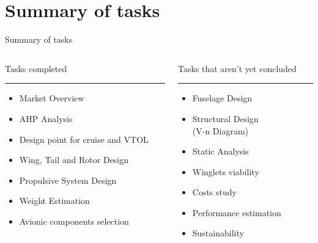 \section{Summary of tasks}
\begin{frame}{Summary of tasks}
    \begin{columns}[T] %
        \begin{column}{.48\textwidth}
        Tasks completed 
        \color{black}\rule{\linewidth}{1pt}
        \begin{itemize}
            \item[\Checkmark] Market Overview
            \item[\Checkmark] AHP Analysis
            \item[\Checkmark] Design point for cruise and VTOL 
            \item[\Checkmark] Wing, Tail and Rotor Design
            \item[\Checkmark] Propulsive System Design
            \item[\Checkmark] Weight Estimation
            \item[\Checkmark] Avionic components selection
        \end{itemize}
        \end{column}%
        \hfill%
        \begin{column}{.48\textwidth}
        Tasks that aren't yet concluded
        \color{black}\rule{\linewidth}{1pt}
        \begin{itemize}
           \item[\XSolidBrush] Fuselage Design
           \item[\XSolidBrush] Structural Design\\ (V-n Diagram)
           \item[\XSolidBrush] Static Analysis
           \item[\XSolidBrush] Winglets viability
           \item[\XSolidBrush] Costs study
           \item[\XSolidBrush] Performance estimation 
           \item[\XSolidBrush] Sustainability
        \end{itemize}
        \end{column}%
    \end{columns}
\end{frame}

